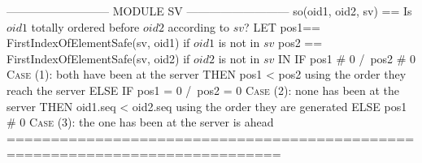 \documentclass[preview, border={5pt 0pt 5pt 1pt}]{standalone}
\begin{document}
\begin{tla}
--------------------------- MODULE SV ---------------------------
so(oid1, oid2, sv) == \* Is $oid1$ totally ordered before $oid2$ according to $sv$?
    LET  pos1== FirstIndexOfElementSafe(sv, oid1)  if $oid1$ is not in $sv$
        pos2 == FirstIndexOfElementSafe(sv, oid2)  if $oid2$ is not in $sv$
    IN  IF pos1 # 0 /\ pos2 # 0 \* \textsc{Case} (1): both have been at the server
        THEN pos1 < pos2        \* using the order they reach the server
        ELSE IF pos1 = 0 /\ pos2 = 0  \* \textsc{Case} (2): none has been at the server
             THEN oid1.seq < oid2.seq \* using the order they are generated
             ELSE pos1 # 0 \* \textsc{Case} (3): the one has been at the server is ahead
=============================================================================
\end{tla}
\begin{tlatex}
\@x{}\moduleLeftDash{}\moduleRightDash\@xx{}%
%
%
\@xx{}%
%
\@xx{}%
%
%
\@xx{}%
%
\@xx{}%
%
%
\@xx{}%
%
%
\@xx{}%
%
%
\@xx{}%
%
%
\@xx{}%
\@x{}\bottombar\@xx{}%
\end{tlatex}
\end{document}
